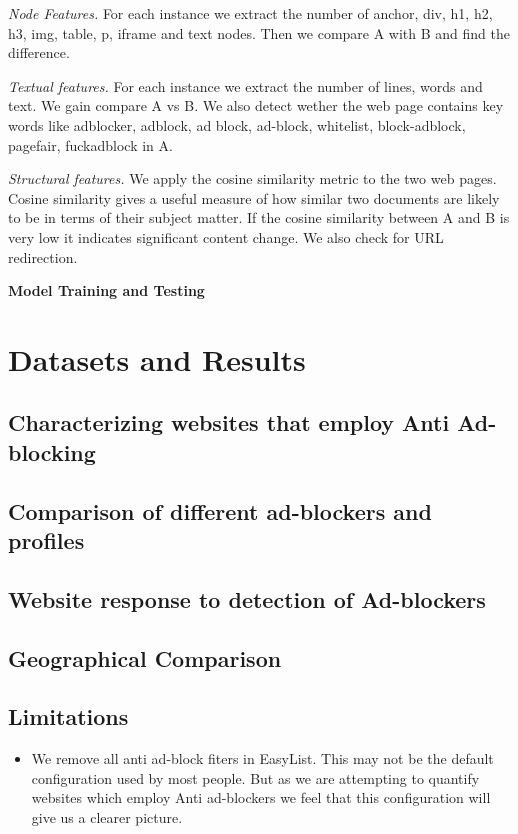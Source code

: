 \documentclass[runningheads,a4paper]{llncs}
\begin{document}
\textit{Node Features.} For each instance we extract the number of anchor,
div, h1, h2, h3, img, table, p, iframe and text nodes. Then we compare A with B and find the difference.

\textit{Textual features.} For each instance we extract the number of lines, words and text. We gain compare A vs B. We also detect wether the web page contains key words like adblocker, adblock, ad block, ad-block, whitelist, block-adblock, pagefair, fuckadblock in A.

\textit{Structural features.} We apply  the cosine similarity metric to the two web pages. Cosine similarity gives a useful measure of how similar two documents are likely to be in terms of their subject matter.
If the cosine similarity between A and B is very low it indicates significant content change. We also check for URL redirection.

\textbf{Model Training and Testing}
        
\section{Datasets and Results}

\subsection{Characterizing websites that employ Anti Ad-blocking}
    
\subsection{Comparison of different ad-blockers and profiles}
    
\subsection{Website response to detection of Ad-blockers}
    
\subsection{Geographical Comparison}
    
\subsection{Limitations}
\begin{itemize}
\item{We remove all anti ad-block fiters in EasyList. This may not be the default configuration used by most people. But as we are attempting to quantify websites which employ Anti ad-blockers we feel that this configuration will give us a clearer picture.}

\end{itemize}
    
\end{document}
